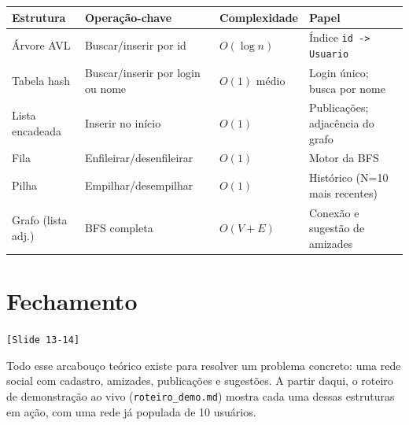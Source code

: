 \documentclass[11pt,a4paper]{article}
\newcommand{\slideref}[1]{\textcolor{accentwarm}{\texttt{[Slide #1]}}}
\newcommand{\code}[1]{\texttt{#1}}
\begin{document}
\begin{center}
\small
\renewcommand{\arraystretch}{1.2}
\begin{tabular}{@{}
  >{\raggedright\arraybackslash}p{2.6cm}
  >{\raggedright\arraybackslash}p{4.4cm}
  >{\raggedright\arraybackslash}p{2.5cm}
  >{\raggedright\arraybackslash}p{4.2cm}@{}}
\toprule
\textbf{Estrutura} & \textbf{Operação-chave} & \textbf{Complexidade} & \textbf{Papel} \\
\midrule
Árvore AVL & Buscar/inserir por id & $O(\log n)$ & Índice \code{id -> Usuario} \\
Tabela hash & Buscar/inserir por login ou nome & $O(1)$ médio & Login único; busca por nome \\
Lista encadeada & Inserir no início & $O(1)$ & Publicações; adjacência do grafo \\
Fila & Enfileirar/desenfileirar & $O(1)$ & Motor da BFS \\
Pilha & Empilhar/desempilhar & $O(1)$ & Histórico (N=10 mais recentes) \\
Grafo (lista adj.) & BFS completa & $O(V+E)$ & Conexão e sugestão de amizades \\
\bottomrule
\end{tabular}
\end{center}

\section*{Fechamento}
\slideref{13-14}

Todo esse arcabouço teórico existe para resolver um problema concreto: uma
rede social com cadastro, amizades, publicações e sugestões. A partir daqui,
o roteiro de demonstração ao vivo (\texttt{roteiro\_demo.md}) mostra cada
uma dessas estruturas em ação, com uma rede já populada de 10 usuários.
\end{document}
